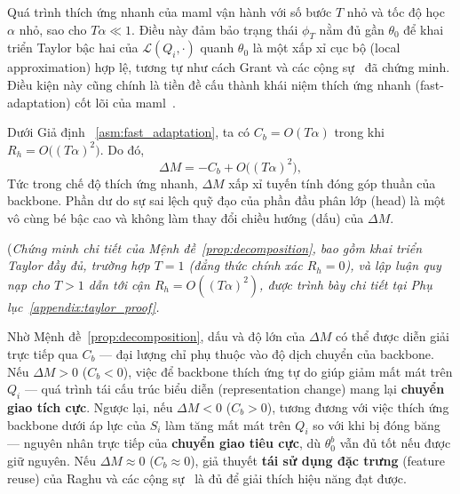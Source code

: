 \begin{assumption}
\label{asm:fast_adaptation}
Quá trình thích ứng nhanh của \acrshort{maml} vận hành với số bước $T$ nhỏ và tốc độ học $\alpha$ nhỏ, sao cho $T\alpha \ll 1$. Điều này đảm bảo trạng thái $\phi_T$ nằm đủ gần $\theta_0$ để khai triển Taylor bậc hai của $\mathcal{L}(Q_i,\cdot)$ quanh $\theta_0$ là một xấp xỉ cục bộ (local approximation) hợp lệ, tương tự như cách Grant và các cộng sự~\cite{grant2018recasting} đã chứng minh. Điều kiện này cũng chính là tiền đề cấu thành khái niệm thích ứng nhanh (fast-adaptation) cốt lõi của \acrshort{maml}~\cite{finn2017model}.
\end{assumption}

\begin{proposition}
\label{prop:decomposition}
Dưới Giả định ~\ref{asm:fast_adaptation}, ta có $C_b = O(T\alpha)$ trong khi $R_h = O\big((T\alpha)^2\big)$. Do đó,
\begin{equation}
    \Delta M = -C_b + O\big((T\alpha)^2\big),
    \label{eq:leading_order}
\end{equation}
Tức trong chế độ thích ứng nhanh, $\Delta M$ xấp xỉ tuyến tính đóng góp thuần của backbone. Phần dư do sự sai lệch quỹ đạo của phần đầu phân lớp (head) là một vô cùng bé bậc cao và không làm thay đổi chiều hướng (dấu) của $\Delta M$.
\end{proposition}

(\textit{Chứng minh chi tiết của Mệnh đề~\ref{prop:decomposition}, bao gồm khai triển Taylor đầy đủ, trường hợp $T=1$ (đẳng thức chính xác $R_h=0$), và lập luận quy nạp cho $T>1$ dẫn tới cận $R_h = O((T\alpha)^2)$, được trình bày chi tiết tại Phụ lục~\ref{appendix:taylor_proof}.}

Nhờ Mệnh đề~\ref{prop:decomposition}, dấu và độ lớn của $\Delta M$ có thể được diễn giải trực tiếp qua $C_b$ — đại lượng chỉ phụ thuộc vào độ dịch chuyển của backbone. Nếu $\Delta M > 0$ ($C_b < 0$), việc để backbone thích ứng tự do giúp giảm mất mát trên $Q_i$ — quá trình tái cấu trúc biểu diễn (representation change) mang lại \textbf{chuyển giao tích cực}. Ngược lại, nếu $\Delta M < 0$ ($C_b > 0$), tương đương với việc thích ứng backbone dưới áp lực của $S_i$ làm tăng mất mát trên $Q_i$ so với khi bị đóng băng — nguyên nhân trực tiếp của \textbf{chuyển giao tiêu cực}, dù $\theta_0^b$ vẫn đủ tốt nếu được giữ nguyên. Nếu $\Delta M \approx 0$ ($C_b \approx 0$), giả thuyết \textbf{tái sử dụng đặc trưng} (feature reuse) của Raghu và các cộng sự~\cite{raghu2019rapid} là đủ để giải thích hiệu năng đạt được.

